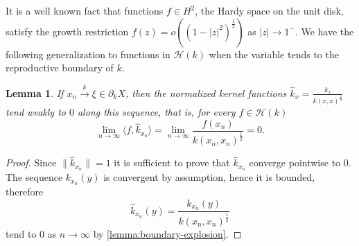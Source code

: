 \documentclass[leqno, final]{article}
\newtheorem{lemma}{Lemma}
\theoremstyle{definition}
\newcommand{\xto}[1]{\stackrel{#1}{\to}}
\newcommand{\Hilbert}{\mathcal{H}}
\newcommand{\rand}{\partial}
\newcommand{\la}{\langle}
\newcommand{\ra}{\rangle}
\begin{document}
It is a well known fact that functions $f\in H^2$, the Hardy space on the unit disk,
satisfy the growth restriction $f(z) = o((1-|z|^2)^\frac12)$ as $|z|\to1^-$.
We have the following generalization to functions in $\Hilbert(k)$ when the
variable tends to the reproductive boundary of $k$.
\begin{lemma}\label{lemma:growth-restriction}
If $x_n\xto{k}\xi\in\rand_kX$, then the normalized kernel functions
$\hat k_x = \frac{k_x}{k(x,x)^\frac12}$ tend weakly to $0$ along this sequence,
that is, for every $f\in\Hilbert(k)$ \begin{equation}
	\lim_{n\to\infty}\la f,\hat k_{x_n}\ra
	= \lim_{n\to\infty}\frac{f(x_n)}{k(x_n,x_n)^\frac12}
	= 0.
\end{equation}
\end{lemma}
\begin{proof}
Since $\|\hat k_{x_n}\|=1$ it is sufficient to prove that $\hat k_{x_n}$ converge
pointwise to $0$. The sequence $k_{x_n}(y)$ is convergent by assumption, hence
it is bounded, therefore \[
	\hat k_{x_n}(y) = \frac{k_{x_n}(y)}{k(x_n,x_n)^\frac12}
\]
tend to $0$ as $n\to\infty$ by \cref{lemma:boundary-explosion}.
\end{proof}
\end{document}
